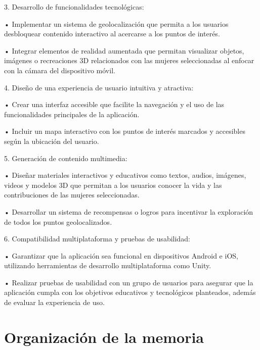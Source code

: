 	3.	Desarrollo de funcionalidades tecnológicas:
    
	•	Implementar un sistema de geolocalización que permita a los usuarios desbloquear contenido interactivo al acercarse a los puntos de interés.
    
	•	Integrar elementos de realidad aumentada que permitan visualizar objetos, imágenes o recreaciones 3D relacionados con las mujeres seleccionadas al enfocar con la cámara del dispositivo móvil.
    
	4.	Diseño de una experiencia de usuario intuitiva y atractiva:
    
	•	Crear una interfaz accesible que facilite la navegación y el uso de las funcionalidades principales de la aplicación.
    
	•	Incluir un mapa interactivo con los puntos de interés marcados y accesibles según la ubicación del usuario.
    
	5.	Generación de contenido multimedia:
    
	•	Diseñar materiales interactivos y educativos como textos, audios, imágenes, videos y modelos 3D que permitan a los usuarios conocer la vida y las contribuciones de las mujeres seleccionadas.
    
	•	Desarrollar un sistema de recompensas o logros para incentivar la exploración de todos los puntos geolocalizados.
    
	6.	Compatibilidad multiplataforma y pruebas de usabilidad:
    
	•	Garantizar que la aplicación sea funcional en 
    dispositivos Android e iOS, utilizando herramientas de desarrollo multiplataforma como Unity.
    
	•	Realizar pruebas de usabilidad con un grupo de usuarios para asegurar que la aplicación cumpla con los objetivos educativos y tecnológicos planteados, además de evaluar la experiencia de uso.
    
\section{Organización de la memoria}
